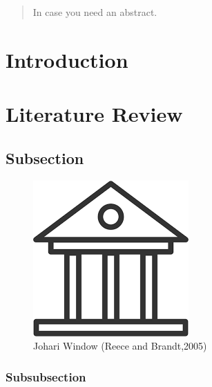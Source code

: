 \documentclass{article}
\begin{document}
\newpage
{}
\tableofcontents

\newpage
\listoffigures

\newpage
\listoftables

\newpage 
{}

\newpage

\begin{abstract}
    In case you need an abstract.\\
    \blindtext
\end{abstract}
\cite{einstein}
\newpage

\section{Introduction}
\blindtext \cite{kum}

\section{Literature Review}
\blindtext \cite{clark}

\subsection{Subsection}
\blindtext

  \begin{figure}[h]
    \begin{center}
    \includegraphics[scale=0.55]{uni.png}
    \caption{Johari Window (Reece and Brandt,2005)}
    \end{center}
 \end{figure}

\subsubsection{Subsubsection}
\end{document}
